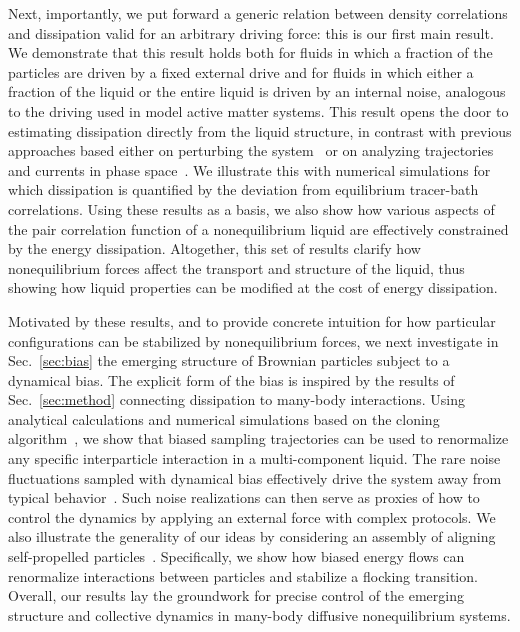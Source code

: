 \documentclass[superscriptaddress, twocolumn, prx, longbibliography, nofootinbib]{revtex4-1}
\begin{document}
Next, importantly, we put forward a generic relation between density correlations and dissipation valid for an arbitrary driving force: this is our first main result. We demonstrate that this result holds both for fluids in which a fraction of the particles are driven by a fixed external drive and for fluids in which either a fraction of the liquid or the entire liquid is driven by an internal noise, analogous to the driving used in model active matter systems. This result opens the door to estimating dissipation directly from the liquid structure, in contrast with previous approaches based either on perturbing the system~\cite{Harada2005, Mizuno2007, Visco2015, Turlier2016, Ahmed2018} or on analyzing trajectories and currents in phase space~\cite{Battle604, Gingrich2017, Roldan2018, Parrondo2018, Li2018}. We illustrate this with numerical simulations for which dissipation is quantified by the deviation from equilibrium tracer-bath correlations. Using these results as a basis, we also show how various aspects of the pair correlation function of a nonequilibrium liquid are effectively constrained by the energy dissipation. Altogether, this set of results clarify how nonequilibrium forces affect the transport and structure of the liquid, thus showing how liquid properties can be modified at the cost of energy dissipation.


Motivated by these results, and to provide concrete intuition for how particular configurations can be stabilized by nonequilibrium forces, we next investigate in Sec.~\ref{sec:bias} the emerging structure of Brownian particles subject to a dynamical bias. The explicit form of the bias is inspired by the results of Sec.~\ref{sec:method} connecting dissipation to many-body interactions. Using analytical calculations and numerical simulations based on the cloning algorithm~\cite{Giadina2006, tailleur2007probing, Hurtado2009, Nemoto2016, Ray2018, Klymko2018, Brewer2018}, we show that biased sampling trajectories can be used to renormalize any specific interparticle interaction in a multi-component liquid. The rare noise fluctuations sampled with dynamical bias effectively drive the system away from typical behavior~\cite{garrahan2007, Hedges2009, Jack2010, Pitard2011, Speck2012, Bodineau2012a, Chetrite2013, Limmer2014, Jack2017}. Such noise realizations can then serve as proxies of how to control the dynamics by applying an external force with complex protocols. We also illustrate the generality of our ideas by considering an assembly of aligning self-propelled particles~\cite{Farrell2012}. Specifically, we show how biased energy flows can renormalize interactions between particles and stabilize a flocking transition. Overall, our results lay the groundwork for precise control of the emerging structure and collective dynamics in many-body diffusive nonequilibrium systems.
\end{document}
